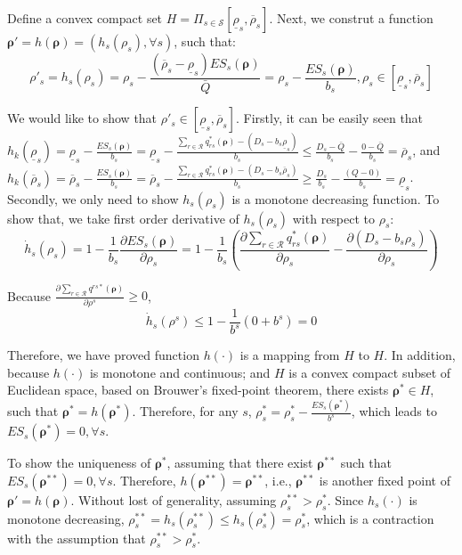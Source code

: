Define a convex compact set $H = \Pi_{s\in \mathcal{S}}[\underline{\rho}_s, \overline{\rho}_s]$. Next, we construt a function $\boldsymbol{\rho}' = h(\boldsymbol{\rho}) = (h_s(\rho_s), \forall s)$, such that:
\[ \rho'_s = h_s(\rho_s) = \rho_s - \frac{(\overline{\rho}_s - \underline{\rho}_s) ES_s(\boldsymbol{\rho})}{\bar{Q}} = \rho_s - \frac{ES_s(\boldsymbol{\rho})}{b_s}, \rho_s \in [\underline{\rho}_s, \overline{\rho}_s] \]


We would like to show that $\rho'_s \in [\underline{\rho}_s, \overline{\rho}_s]$. Firstly, it can be easily seen that $h_k(\underline{\rho}_s) = \underline{\rho}_s - \frac{ES_s(\boldsymbol{\rho})}{b_s} = \underline{\rho}_s - \frac{\sum_{r \in \mathcal{R}}q_{rs}^{\ast} (\bm{\rho}) - (D_s - b_s \underline{\rho}_s)}{b_s} \leq \frac{D_s-\bar{Q}}{b_s}- \frac{0 - \bar{Q}}{b_s}= \overline{\rho}_s $, and $h_k(\overline{\rho}_s) = \overline{\rho}_s - \frac{ES_s(\boldsymbol{\rho})}{b_s} = \overline{\rho}_s - \frac{\sum_{r \in \mathcal{R}}q_{rs}^{\ast} (\bm{\rho}) - (D_s - b_s \overline{\rho}_s)}{b_s} \geq \frac{D_s}{b_s} - \frac{(Q - 0)}{b_s} = \underline{\rho}_s$. Secondly, we only need to show $h_s(\rho_s)$ is a monotone decreasing function. To show that, we take first order derivative of $h_s(\rho_s)$ with respect to $\rho_s$:
\[ \dot{h}_s(\rho_s) = 1 - \frac{1}{b_s}\frac{\partial ES_s(\boldsymbol{\rho})}{\partial\rho_s } = 1 - \frac{1}{b_s}(\frac{\partial \sum_{r \in \mathcal{R}}q_{rs}^{\ast} (\bm{\rho})}{\partial\rho_s } - \frac{\partial(D_s - b_s \rho_s)}{\partial\rho_s })\]


Because $\frac{\partial \sum_{r \in \mathcal{R}}q^{rs\ast} (\bm{\rho})}{\partial\rho^s } \geq 0$, 
\[ \dot{h}_s(\rho^s) \leq 1 - \frac{1}{b^s} (0 + b^s) = 0\]
 
Therefore, we have proved function $h(\cdot)$ is a mapping from $H$ to $H$. 
In addition, because $h(\cdot)$ is monotone and continuous; and $H$ is a convex compact subset of Euclidean space, based on Brouwer's fixed-point theorem, there exists $\boldsymbol{\rho}^{\ast} \in H$, such that $\boldsymbol{\rho}^{\ast} = h(\boldsymbol{\rho}^{\ast})$. Therefore, for any $s$, $\rho_s^{\ast} = \rho_s^{\ast} - \frac{ES_s(\boldsymbol{\rho}^{\ast})}{b^s}$, which leads to $ES_s(\boldsymbol{\rho}^{\ast}) = 0, \forall s$.

To show the uniqueness of $\bm{\rho}^{\ast}$, assuming that there exist $\bm{\rho}^{\ast\ast}$ such that $ES_s(\boldsymbol{\rho}^{\ast\ast}) = 0, \forall s$. Therefore,  $h(\boldsymbol{\rho}^{\ast\ast}) = \boldsymbol{\rho}^{\ast\ast}$, i.e., $\boldsymbol{\rho}^{\ast\ast}$ is another fixed point of $\boldsymbol{\rho}' = h(\boldsymbol{\rho})$. Without lost of generality, assuming ${\rho}_s^{\ast\ast} > {\rho}_s^{\ast}$. Since $h_s(\cdot)$ is monotone decreasing, $\rho_s^{\ast\ast} = h_s(\rho_s^{\ast\ast}) \leq h_s(\rho_s^{\ast}) = \rho_s^{\ast}$, which is a contraction with the assumption that ${\rho}_s^{\ast\ast} > {\rho}_s^{\ast}$.
\eop

